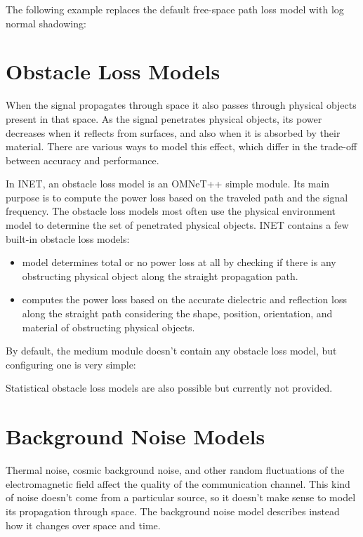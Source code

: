 The following example replaces the default free-space path loss model with
log normal shadowing:


\section{Obstacle Loss Models}

When the signal propagates through space it also passes through physical
objects present in that space. As the signal penetrates physical objects,
its power decreases when it reflects from surfaces, and also when it is
absorbed by their material. There are various ways to model this effect,
which differ in the trade-off between accuracy and performance.

In INET, an obstacle loss model is an OMNeT++ simple module. Its main
purpose is to compute the power loss based on the traveled path and the
signal frequency. The obstacle loss models most often use the physical
environment model to determine the set of penetrated physical objects.
INET contains a few built-in obstacle loss models:

\begin{itemize}
        \item {} model determines total or no power loss at all by checking if there is any obstructing physical object along the straight propagation path.
        \item {} computes the power loss based on the accurate dielectric and reflection loss along the straight path considering the shape, position, orientation, and material of obstructing physical objects.
\end{itemize}

By default, the medium module doesn't contain any obstacle loss model, but
configuring one is very simple:


Statistical obstacle loss models are also possible but currently not provided.

\section{Background Noise Models}

Thermal noise, cosmic background noise, and other random fluctuations of
the electromagnetic field affect the quality of the communication channel.
This kind of noise doesn't come from a particular source, so it doesn't
make sense to model its propagation through space. The background noise
model describes instead how it changes over space and time.

